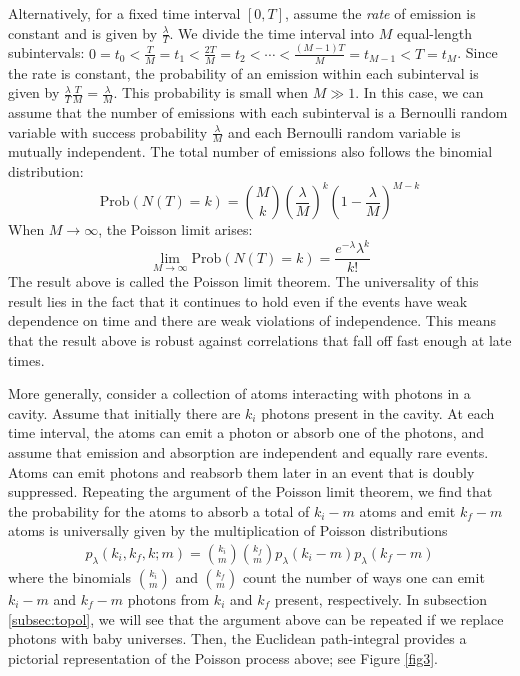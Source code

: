 \documentclass[a4paper,11pt]{article}
\theoremstyle{definition}
\numberwithin{equation}{section}
\newcommand{\lb}{\left(}
\newcommand{\rb}{\right)}
\begin{document}
Alternatively, for a fixed time interval $[0, T]$, assume the \textit{rate} of emission is constant and is given by $\frac{\lambda}{T}$. We divide the time interval into $M$ equal-length subintervals: $0 = t_0 < \frac{T}{M} = t_1 < \frac{2T}{M} = t_2 < \cdots < \frac{(M - 1)T}{M} = t_{M - 1} < T = t_M$. Since the rate is constant, the probability of an emission within each subinterval is given by $\frac{\lambda}{T}\frac{T}{M} = \frac{\lambda}{M}$. This probability is small when $M \gg 1$. In this case, we can assume that the number of emissions with each subinterval is a Bernoulli random variable with success probability $\frac{\lambda}{M}$ and each Bernoulli random variable is mutually independent. The total number of emissions also follows the binomial distribution:
\begin{equation}
    \text{Prob}(N(T) = k) = \binom{M}{k}\lb \frac{\lambda}{M}\rb^{k}\lb 1 - \frac{\lambda}{M}\rb^{M - k}
\end{equation}
When $M\rightarrow\infty$, the Poisson limit arises:
\begin{equation}
    \lim_{M\rightarrow\infty}\text{Prob}(N(T) = k)= \frac{e^{-\lambda}\lambda^k}{k!}
\end{equation}
The result above is called the Poisson limit theorem. The universality of this result lies in the fact that it continues to hold even if the events have weak dependence on time and there are weak violations of independence. This means that the result above is robust against correlations that fall off fast enough at late times.


 More generally, consider a collection of atoms interacting with photons in a cavity. Assume that initially there are $k_i$ photons present in the cavity. At each time interval, the atoms can emit a photon or absorb one of the photons, and assume that emission and absorption are independent and equally rare events. Atoms can emit photons and reabsorb them later in an event that is doubly suppressed.
 Repeating the argument of the Poisson limit theorem, we find that the probability for the atoms to absorb a total of $k_i-m$ atoms and emit $k_f-m$ atoms is universally given by the multiplication of Poisson distributions
 \begin{eqnarray}\label{rareeventscoleman}
     p_\lambda(k_i,k_f,k;m)={k_i \choose m} {k_f \choose m} p_\lambda(k_i-m) p_\lambda(k_f-m)
 \end{eqnarray}
 where the binomials ${k_i \choose m}$ and ${k_f \choose m}$ count the number of ways one can emit $k_i-m$ and $k_f-m$ photons from $k_i$ and $k_f$ present, respectively. In subsection \ref{subsec:topol}, we will see that the argument above can be repeated if we replace photons with baby universes. Then, the Euclidean path-integral provides a pictorial representation of the Poisson process above; see Figure \ref{fig3}.
\end{document}

